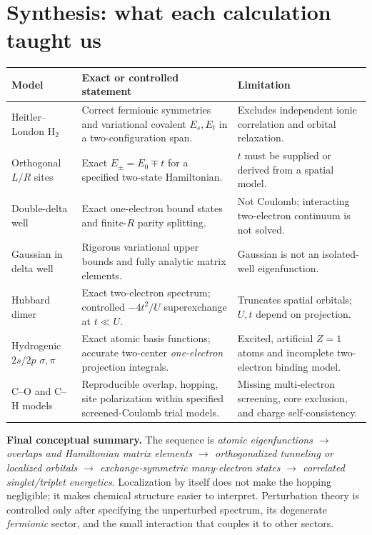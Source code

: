 \documentclass[11pt,letterpaper]{article}
\newcommand{\highlight}[1]{\par\smallskip\noindent\colorbox{pale}{\parbox{0.956\linewidth}{\strut #1\strut}}\smallskip\par}
\begin{document}
\section{Synthesis: what each calculation taught us}
\begin{center}
\small
\begin{tabular}{p{.23\linewidth}p{.32\linewidth}p{.35\linewidth}}
\toprule
\textbf{Model} & \textbf{Exact or controlled statement} & \textbf{Limitation}\\\midrule
Heitler--London $\mathrm H_2$ & Correct fermionic symmetries and variational covalent $E_s,E_t$ in a two-configuration span. & Excludes independent ionic correlation and orbital relaxation.\\
Orthogonal $L/R$ sites & Exact $E_\pm=E_0\mp t$ for a specified two-state Hamiltonian. & $t$ must be supplied or derived from a spatial model.\\
Double-delta well & Exact one-electron bound states and finite-$R$ parity splitting. & Not Coulomb; interacting two-electron continuum is not solved.\\
Gaussian in delta well & Rigorous variational upper bounds and fully analytic matrix elements. & Gaussian is not an isolated-well eigenfunction.\\
Hubbard dimer & Exact two-electron spectrum; controlled $-4t^2/U$ superexchange at $t\ll U$. & Truncates spatial orbitals; $U,t$ depend on projection.\\
Hydrogenic $2s/2p$ $\sigma,\pi$ & Exact atomic basis functions; accurate two-center \emph{one-electron} projection integrals. & Excited, artificial $Z=1$ atoms and incomplete two-electron binding model.\\
C--O and C--H models & Reproducible overlap, hopping, site polarization within specified screened-Coulomb trial models. & Missing multi-electron screening, core exclusion, and charge self-consistency.\\
\bottomrule
\end{tabular}
\end{center}

\highlight{\textbf{Final conceptual summary.} The sequence is \emph{atomic eigenfunctions $\to$ overlaps and Hamiltonian matrix elements $\to$ orthogonalized tunneling or localized orbitals $\to$ exchange-symmetric many-electron states $\to$ correlated singlet/triplet energetics}. Localization by itself does not make the hopping negligible; it makes chemical structure easier to interpret. Perturbation theory is controlled only after specifying the unperturbed spectrum, its degenerate \emph{fermionic} sector, and the small interaction that couples it to other sectors.}
\end{document}
